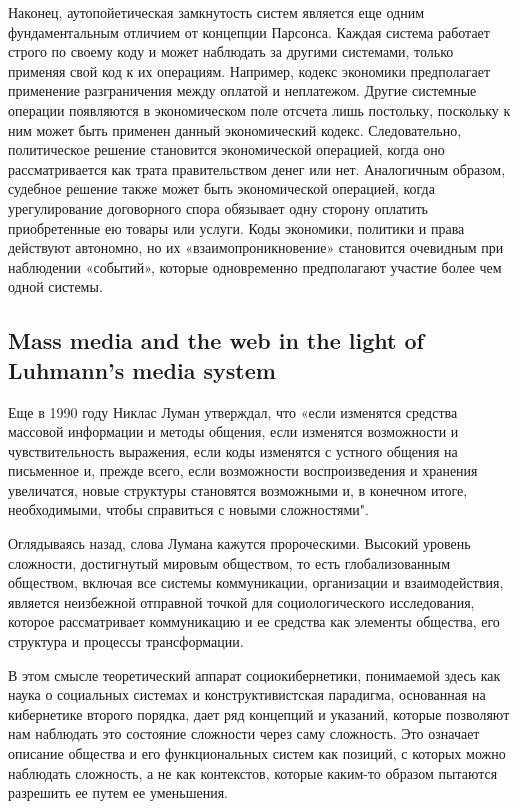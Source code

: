 \documentclass[a4page]{article}
\begin{document}
Наконец, аутопойетическая замкнутость систем является еще одним фундаментальным отличием от концепции Парсонса. Каждая система работает строго по своему коду и может наблюдать за другими системами, только применяя свой код к их операциям. Например, кодекс экономики предполагает применение разграничения между оплатой и неплатежом. Другие системные операции появляются в экономическом поле отсчета лишь постольку, поскольку к ним может быть применен данный экономический кодекс. Следовательно, политическое решение становится экономической операцией, когда оно рассматривается как трата правительством денег или нет. Аналогичным образом, судебное решение также может быть экономической операцией, когда урегулирование договорного спора обязывает одну сторону оплатить приобретенные ею товары или услуги. Коды экономики, политики и права действуют автономно, но их «взаимопроникновение»\cite{social_systems} становится очевидным при наблюдении «событий»\cite{theory_of_society_2}, которые одновременно предполагают участие более чем одной системы.

\subsection{Mass media and the web in the light of Luhmann’s media system}
Еще в 1990 году Никлас Луман утверждал, что «если изменятся средства массовой информации и методы общения, если изменятся возможности и чувствительность выражения, если коды изменятся с устного общения на письменное и, прежде всего, если возможности воспроизведения и хранения увеличатся, новые структуры становятся возможными и, в конечном итоге, необходимыми, чтобы справиться с новыми сложностями"\cite{self_reference}.

Оглядываясь назад, слова Лумана кажутся пророческими. Высокий уровень сложности, достигнутый мировым обществом, то есть глобализованным обществом, включая все системы коммуникации, организации и взаимодействия, является неизбежной отправной точкой для социологического исследования, которое рассматривает коммуникацию и ее средства как элементы общества, его структура и процессы трансформации.

В этом смысле теоретический аппарат социокибернетики, понимаемой здесь как наука о социальных системах и конструктивистская парадигма, основанная на кибернетике второго порядка, дает ряд концепций и указаний, которые позволяют нам наблюдать это состояние сложности через саму сложность. Это означает описание общества и его функциональных систем как позиций, с которых можно наблюдать сложность, а не как контекстов, которые каким-то образом пытаются разрешить ее путем ее уменьшения.
\end{document}
